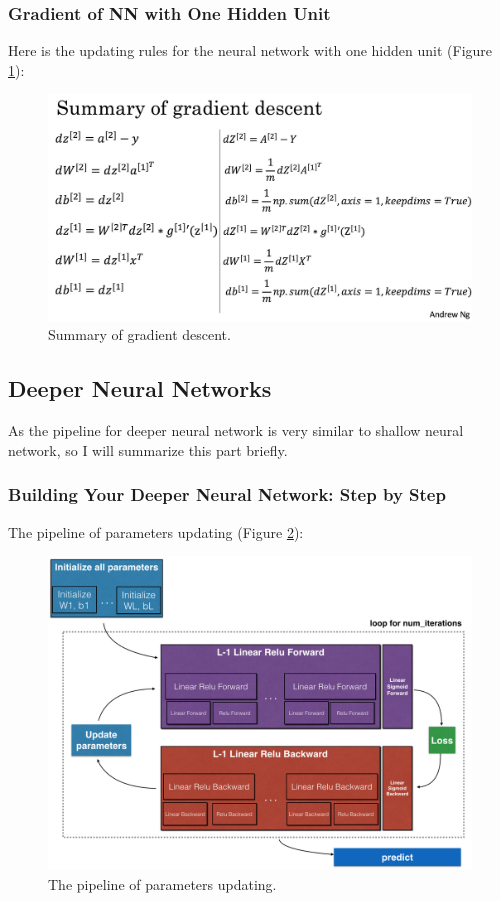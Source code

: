 \subsubsection{Gradient of NN with One Hidden Unit}
Here is the updating rules for the neural network with one hidden unit (Figure \ref{grad-summary}):

\begin{figure}[!htbp]
    \centering 
    \includegraphics[width=1.0\textwidth, trim={0 0 0 60}, clip]{img/c1/grad_summary.png}
    \caption{Summary of gradient descent.}
    \label{grad-summary}
\end{figure}


\subsection{Deeper Neural Networks}
As the pipeline for deeper neural network is very similar to shallow neural network, so I will summarize this part briefly.

\subsubsection{Building Your Deeper Neural Network: Step by Step}
The pipeline of parameters updating (Figure \ref{final-outline}):

\begin{figure}[!htbp]
    \centering 
    \includegraphics[width=1.0\textwidth, trim={0 0 0 0}, clip]{img/c1/final outline.png}
    \caption{The pipeline of parameters updating.}
    \label{final-outline}
\end{figure}

